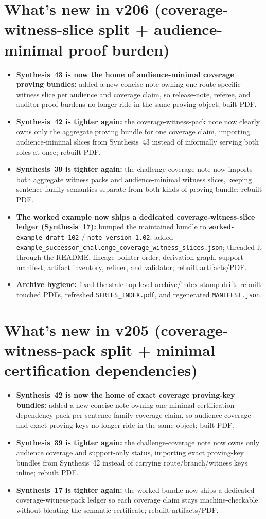 \documentclass[11pt]{article}
\begin{document}
\section{What's new in v206 (coverage-witness-slice split + audience-minimal proof burden)}
\begin{itemize}[leftmargin=*]
\item \textbf{Synthesis~43 is now the home of audience-minimal coverage proving bundles:} added a new concise note owning one route-specific witness slice per audience and coverage claim, so release-note, referee, and auditor proof burdens no longer ride in the same proving object; built PDF.
\item \textbf{Synthesis~42 is tighter again:} the coverage-witness-pack note now clearly owns only the aggregate proving bundle for one coverage claim, importing audience-minimal slices from Synthesis~43 instead of informally serving both roles at once; rebuilt PDF.
\item \textbf{Synthesis~39 is tighter again:} the challenge-coverage note now imports both aggregate witness packs and audience-minimal witness slices, keeping sentence-family semantics separate from both kinds of proving bundle; rebuilt PDF.
\item \textbf{The worked example now ships a dedicated coverage-witness-slice ledger (Synthesis~17):} bumped the maintained bundle to \texttt{worked-example-draft-102} / \texttt{note\_version 1.02}; added \texttt{example\_successor\_challenge\_coverage\_witness\_slices.json}; threaded it through the README, lineage pointer order, derivation graph, support manifest, artifact inventory, refiner, and validator; rebuilt artifacts/PDF.
\item \textbf{Archive hygiene:} fixed the stale top-level archive/index stamp drift, rebuilt touched PDFs, refreshed \texttt{SERIES\_INDEX.pdf}, and regenerated \texttt{MANIFEST.json}.
\end{itemize}

\section{What's new in v205 (coverage-witness-pack split + minimal certification dependencies)}
\begin{itemize}[leftmargin=*]
\item \textbf{Synthesis~42 is now the home of exact coverage proving-key bundles:} added a new concise note owning one minimal certification dependency pack per sentence-family coverage claim, so audience coverage and exact proving keys no longer ride in the same object; built PDF.
\item \textbf{Synthesis~39 is tighter again:} the challenge-coverage note now owns only audience coverage and support-only status, importing exact proving-key bundles from Synthesis~42 instead of carrying route/branch/witness keys inline; rebuilt PDF.
\item \textbf{Synthesis~17 is tighter again:} the worked bundle now ships a dedicated coverage-witness-pack ledger so each coverage claim stays machine-checkable without bloating the semantic certificate; rebuilt artifacts/PDF.
\end{itemize}
\end{document}
